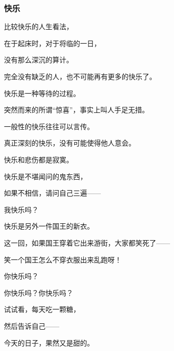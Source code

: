 \subsubsection{快乐}

\par 比较快乐的人生看法，
\par 在于起床时，对于将临的一日，
\par 没有那么深沉的算计。
\par 
\par 完全没有缺乏的人，也不可能再有更多的快乐了。
\par 
\par 快乐是一种等待的过程。
\par 突然而来的所谓“惊喜”，事实上叫人手足无措。
\par 
\par 一般性的快乐往往可以言传。
\par 真正深刻的快乐，没有可能使得他人意会。
\par 快乐和悲伤都是寂寞。
\par 
\par 快乐是不堪闻问的鬼东西，
\par 如果不相信，请问自己三遍——
\par 我快乐吗？
\par 
\par 快乐是另外一件国王的新衣。
\par 这一回，如果国王穿着它出来游街，大家都笑死了——
\par 笑一个国王怎么不穿衣服出来乱跑呀！
\par 
\par 你快乐吗？
\par 你快乐吗？你快乐吗？
\par 
\par 试试看，每天吃一颗糖，
\par 然后告诉自己——
\par 今天的日子，果然又是甜的。


\subsubsection{}




